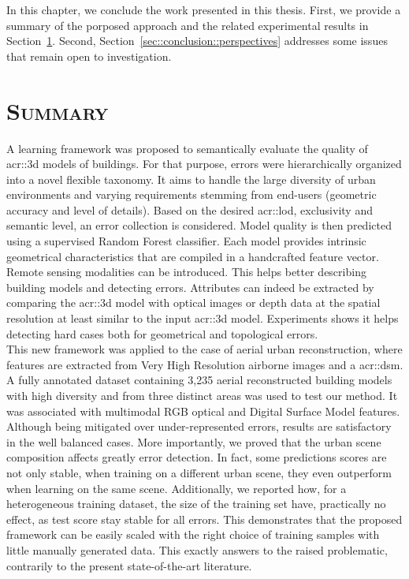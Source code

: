 \minitoc

\vfill

In this chapter, we conclude the work presented in this thesis.
First, we provide a summary of the porposed approach and the related experimental results in Section~\ref{sec::conclusion::summary}.
Second, Section~\ref{sec::conclusion::perspectives} addresses some issues that remain open to investigation.

\clearpage

\section{\textsc{Summary}}
    \label{sec::conclusion::summary}
    A learning framework was proposed to semantically evaluate the quality of \gls{acr::3d} models of buildings.
    For that purpose, errors were hierarchically organized into a novel flexible taxonomy.
    It aims to handle the large diversity of urban environments and varying requirements stemming from end-users (geometric accuracy and level of details).
    Based on the desired \gls{acr::lod}, exclusivity and semantic level, an error collection is considered.
    Model quality is then predicted using a supervised Random Forest classifier.
    Each model provides intrinsic geometrical characteristics that are compiled in a handcrafted feature vector.
    Remote sensing modalities can be introduced.
    This helps better describing building models and detecting errors.
    Attributes can indeed be extracted by comparing the \gls{acr::3d} model with optical images or depth data at the spatial resolution at least similar to the input \gls{acr::3d} model.
    Experiments shows it helps detecting hard cases both for geometrical and topological errors.\\

    This new framework was applied to the case of aerial urban reconstruction, where features are extracted from Very High Resolution airborne images and a \gls*{acr::dsm}.
    A fully annotated dataset containing 3,235 aerial reconstructed building models with high diversity and from three distinct areas was used to test our method.
    It was associated with multimodal RGB optical and Digital Surface Model features.
    Although being mitigated over under-represented errors, results are satisfactory in the well balanced cases.
    More importantly, we proved that the urban scene composition affects greatly error detection.
    In fact, some predictions scores are not only stable, when training on a different urban scene, they even outperform when learning on the same scene.
    Additionally, we reported how, for a heterogeneous training dataset, the size of the training set have, practically no effect, as test score stay stable for all errors.
    This demonstrates that the proposed framework can be easily scaled with the right choice of training samples with little manually generated data.
    This exactly answers to the raised problematic, contrarily to the present state-of-the-art literature.

